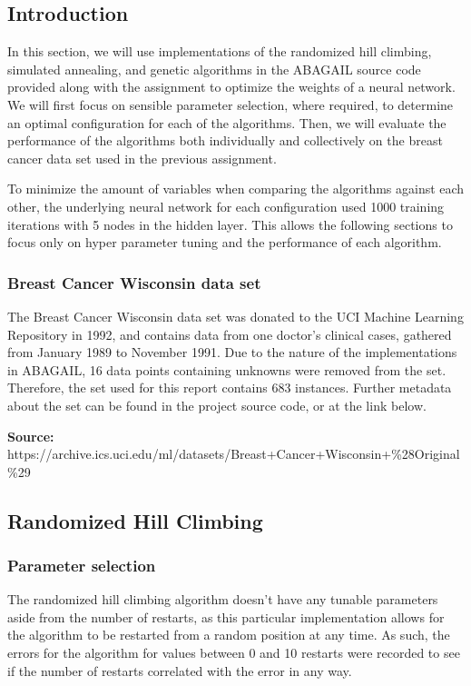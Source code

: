 \documentclass{article}
\begin{document}
    \subsection{Introduction}
      In this section, we will use implementations of the randomized hill climbing, simulated annealing, and genetic algorithms in the ABAGAIL source code provided along with the assignment to optimize the weights of a neural network. We will first focus on sensible parameter selection, where required, to determine an optimal configuration for each of the algorithms. Then, we will evaluate the performance of the algorithms both individually and collectively on the breast cancer data set used in the previous assignment.

      To minimize the amount of variables when comparing the algorithms against each other, the underlying neural network for each configuration used 1000 training iterations with 5 nodes in the hidden layer. This allows the following sections to focus only on hyper parameter tuning and the performance of each algorithm.

      \subsubsection{Breast Cancer Wisconsin data set}
        The Breast Cancer Wisconsin data set was donated to the UCI Machine Learning Repository in 1992, and contains data from one doctor's clinical cases, gathered from January 1989 to November 1991. Due to the nature of the implementations in ABAGAIL, 16 data points containing unknowns were removed from the set. Therefore, the set used for this report contains 683 instances. Further metadata about the set can be found in the project source code, or at the link below.

        \textbf{Source:} https://archive.ics.uci.edu/ml/datasets/Breast+Cancer+Wisconsin+\%28Original\%29

    \subsection{Randomized Hill Climbing}

      \subsubsection{Parameter selection}
        The randomized hill climbing algorithm doesn't have any tunable parameters aside from the number of restarts, as this particular implementation allows for the algorithm to be restarted from a random position at any time. As such, the errors for the algorithm for values between 0 and 10 restarts were recorded to see if the number of restarts correlated with the error in any way.
\end{document}
